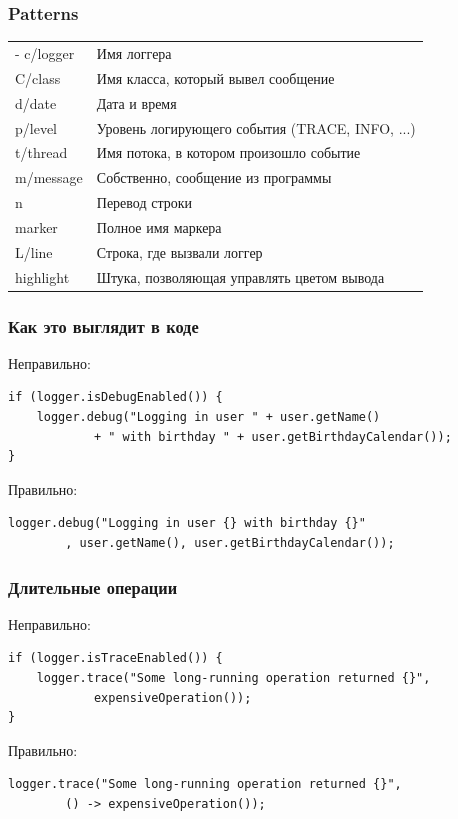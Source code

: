 \documentclass[xetex,mathserif,serif]{beamer}
\begin{document}
	\begin{frame}
		\frametitle{Patterns}
		\begin{tabu} {| X[0.2 l p] | X[1 l p] |}
			\tabucline-
			\everyrow{\tabucline-}
			c/logger   & Имя логгера                                    \\
			C/class    & Имя класса, который вывел сообщение            \\
			d/date     & Дата и время                                   \\
			p/level    & Уровень логирующего события (TRACE, INFO, ...) \\
			t/thread   & Имя потока, в котором произошло событие        \\
			m/message  & Собственно, сообщение из программы             \\
			n          & Перевод строки                                 \\
			marker     & Полное имя маркера                             \\
			L/line     & Строка, где вызвали логгер                     \\
			highlight  & Штука, позволяющая управлять цветом вывода     \\
		\end{tabu}
	\end{frame}

	\begin{frame}[fragile]
		\frametitle{Как это выглядит в коде}
		Неправильно:
		\begin{verbatim}
if (logger.isDebugEnabled()) {
    logger.debug("Logging in user " + user.getName() 
            + " with birthday " + user.getBirthdayCalendar());
}
		\end{verbatim}

		Правильно:
		\begin{verbatim}
logger.debug("Logging in user {} with birthday {}"
        , user.getName(), user.getBirthdayCalendar());
		\end{verbatim}
\end{frame}

	\begin{frame}[fragile]
		\frametitle{Длительные операции}
		Неправильно:
		\begin{verbatim}
if (logger.isTraceEnabled()) {
    logger.trace("Some long-running operation returned {}", 
            expensiveOperation());
}
		\end{verbatim}

		Правильно:
		\begin{verbatim}
logger.trace("Some long-running operation returned {}", 
        () -> expensiveOperation());
		\end{verbatim}
\end{frame}
\end{document}

